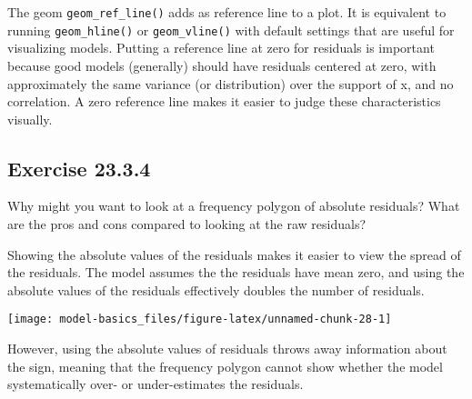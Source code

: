 \documentclass[]{book}
\newenvironment{Shaded}{\begin{snugshade}}{\end{snugshade}}
\newcommand{\DataTypeTok}[1]{\textcolor[rgb]{0.13,0.29,0.53}{#1}}
\newcommand{\FloatTok}[1]{\textcolor[rgb]{0.00,0.00,0.81}{#1}}
\newcommand{\KeywordTok}[1]{\textcolor[rgb]{0.13,0.29,0.53}{\textbf{#1}}}
\newcommand{\NormalTok}[1]{#1}
\newcommand{\OperatorTok}[1]{\textcolor[rgb]{0.81,0.36,0.00}{\textbf{#1}}}
\newcommand{\StringTok}[1]{\textcolor[rgb]{0.31,0.60,0.02}{#1}}
\theoremstyle{plain}
\theoremstyle{remark}
\begin{document}
The geom \texttt{geom\_ref\_line()} adds as reference line to a plot. It
is equivalent to running \texttt{geom\_hline()} or
\texttt{geom\_vline()} with default settings that are useful for
visualizing models. Putting a reference line at zero for residuals is
important because good models (generally) should have residuals centered
at zero, with approximately the same variance (or distribution) over the
support of x, and no correlation. A zero reference line makes it easier
to judge these characteristics visually.

\hypertarget{exercise-23.3.4}{%
\subsection*{\texorpdfstring{Exercise
{23.3.4}}{Exercise 23.3.4}}\label{exercise-23.3.4}}

Why might you want to look at a frequency polygon of absolute residuals?
What are the pros and cons compared to looking at the raw residuals?

Showing the absolute values of the residuals makes it easier to view the
spread of the residuals. The model assumes the the residuals have mean
zero, and using the absolute values of the residuals effectively doubles
the number of residuals.

\begin{Shaded}
\end{Shaded}

\begin{center}\texttt{[image: model-basics\_files/figure-latex/unnamed-chunk-28-1]} \end{center}

However, using the absolute values of residuals throws away information
about the sign, meaning that the frequency polygon cannot show whether
the model systematically over- or under-estimates the residuals.
\end{document}
